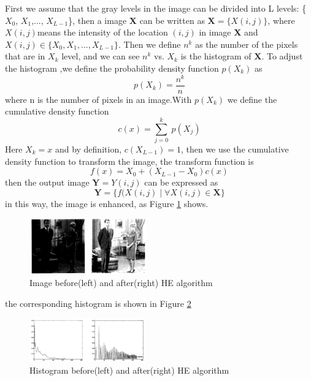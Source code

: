 \documentclass[10pt,twocolumn,letterpaper]{article}
\begin{document}
First we assume that the  gray levels in the image can be divided into L levels: \{$X_0$, $X_1$,..., $X_{L-1}$\}, then a image \textbf{X} can be written as $\mathbf{X}=\{X(i,j)\}$, where $X(i,j)$means the intensity of the location $(i,j)$ in image \textbf{X} and $ X(i,j) \in \{X_0,X_1,..., X_{L-1}\}$. Then we define  $n^k$ as the number of the pixels that are in $X_k$ level, and we can see $n^k$ vs. $X_k$ is the histogram of $\mathbf{X}$. To adjust the histogram ,we define the probability density function $p(X_k)$ as
\begin{equation}
    p(X_k)=\frac{n^k}{n}
\end{equation}
where n is the number of pixels in an image.With $p(X_k)$ we define the cumulative density function
\begin{equation}
    c(x)=\sum_{j=0}^k\ p(X_j)
\end{equation}
Here $X_k= x$ and by definition, $c(X_{L-1})= 1$, then we use the cumulative density function to transform the image, the transform function is
\begin{equation}
    f(x)=X_0+(X_{L-1}-X_0)c(x)
\end{equation}
then the output image $\mathbf{Y}=Y(i,j)$ can be expressed as
\begin{equation}
    \mathbf{Y}=\{ f (X(i,j) \mid \forall X(i,j) \in \mathbf{X} \}
\end{equation}
in this way, the image is enhanced, as Figure \ref{fig:couple} shows.
\begin{figure}[t]
    \centering
    \includegraphics[width=0.45\textwidth]{latex/Couple.png}
    \caption{Image before(left) and after(right) HE algorithm \cite{kim1997contrast}}
    \label{fig:couple}
\end{figure}
the corresponding histogram is shown in Figure \ref{fig:c_his}
\begin{figure}[t]
    \centering
    \includegraphics[width=0.45\textwidth]{latex/Couple_histogram.png}
    \caption{Histogram before(left) and after(right) HE algorithm \cite{kim1997contrast}}
    \label{fig:c_his}
\end{figure}
\end{document}
